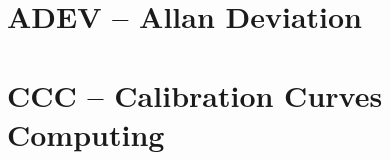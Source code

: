 \documentclass[12pt,a4paper,oneside]{report} %
\begin{document}
% 
% 
% 
% 

\chapter{ADEV -- Allan Deviation} %
\stopcontents[maintoc]
\section*{\infosection} %

\section*{\examplesection} %

\resumecontents[maintoc]

\chapter{CCC -- Calibration Curves Computing} %
\stopcontents[maintoc]
\end{document}
